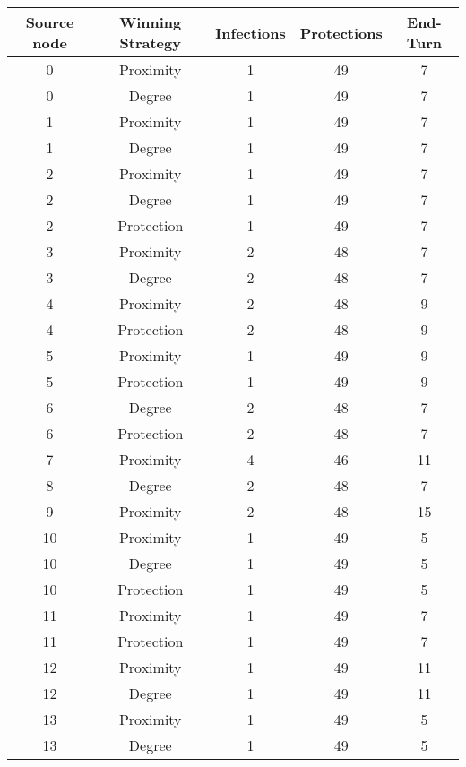 \documentclass[results.tex]{subfiles}
\begin{document}
\begin{center}
  \begin{tabular}{| c || c | c | c | c |}
    \hline
    {\bfseries Source node} & {\bfseries Winning Strategy} & {\bfseries Infections} & {\bfseries Protections} & {\bfseries End-Turn} \\  %
    \hline\hline
    0 & Proximity & 1 & 49 & 7 \\ 
    \hline
    0 & Degree & 1 & 49 & 7 \\ 
    \hline
    1 & Proximity & 1 & 49 & 7 \\ 
    \hline
    1 & Degree & 1 & 49 & 7 \\ 
    \hline
    2 & Proximity & 1 & 49 & 7 \\ 
    \hline
    2 & Degree & 1 & 49 & 7 \\ 
    \hline
    2 & Protection & 1 & 49 & 7 \\ 
    \hline
    3 & Proximity & 2 & 48 & 7 \\ 
    \hline
    3 & Degree & 2 & 48 & 7 \\ 
    \hline
    4 & Proximity & 2 & 48 & 9 \\ 
    \hline
    4 & Protection & 2 & 48 & 9 \\ 
    \hline
    5 & Proximity & 1 & 49 & 9 \\ 
    \hline
    5 & Protection & 1 & 49 & 9 \\ 
    \hline
    6 & Degree & 2 & 48 & 7 \\ 
    \hline
    6 & Protection & 2 & 48 & 7 \\ 
    \hline
    7 & Proximity & 4 & 46 & 11 \\ 
    \hline
    8 & Degree & 2 & 48 & 7 \\ 
    \hline
    9 & Proximity & 2 & 48 & 15 \\ 
    \hline
    10 & Proximity & 1 & 49 & 5 \\ 
    \hline
    10 & Degree & 1 & 49 & 5 \\ 
    \hline
    10 & Protection & 1 & 49 & 5 \\ 
    \hline
    11 & Proximity & 1 & 49 & 7 \\ 
    \hline
    11 & Protection & 1 & 49 & 7 \\ 
    \hline
    12 & Proximity & 1 & 49 & 11 \\ 
    \hline
    12 & Degree & 1 & 49 & 11 \\ 
    \hline
    13 & Proximity & 1 & 49 & 5 \\ 
    \hline
    13 & Degree & 1 & 49 & 5 \\ 

\end{tabular}
\end{center}
\end{document}
